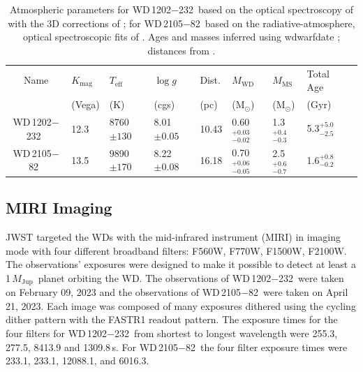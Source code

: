 \documentclass[twocolumn]{aastex631}
\newcommand{\mj}{\,$M_\mathrm{Jup}$}
\newcommand{\wdA}{WD\,1202$-$232}
\newcommand{\wdB}{WD\,2105$-$82}
\newcommand{\teff}{${T}_{\mathrm{eff}}$}
\newcommand{\logg}{$\log{g}$}
\begin{document}
\begin{table}[]
    \centering
    \begin{tabular}{c|llllllll}
    \hline
    \hline
  Name & $K_{\mathrm{mag}}$ &  \teff\ & \logg\ & Dist. &   $M_{\mathrm{WD}}$ & $M_\mathrm{{MS}}$ & Total Age \\
 & (Vega) & (K) & (cgs)  & (pc)  & (M$_{\odot}$) & (M$_{\odot}$) & (Gyr) \\ [0.5ex]
    \hline
         \wdA\   & 12.3  & 8760$\pm130$  & 8.01$\pm0.05$ &  10.43   & 0.60$^{+0.03}_{-0.02}$ & 1.3$^{+0.4}_{-0.3}$ & 5.3$^{+5.0}_{-2.5}$ \\
         \wdB\ &  13.5  & 9890$\pm170$ & 8.22$\pm0.08$ & 16.18  & 0.70$^{+0.06}_{-0.05}$ & 2.5$^{+0.6}_{-0.7}$ & 1.6$^{+0.8}_{-0.2}$ \\
    \end{tabular}
    \caption{Atmospheric parameters for \wdA\ based on the optical spectroscopy of \citet{Gianninas2011ApJ} with the 3D corrections of \citet{Tremblay2013}; for \wdB\ based on the radiative-atmosphere, optical spectroscopic fits of \citet{Gentile2018}. Ages and masses inferred using wdwarfdate \citep{Kiman2022}; distances from \citet{GaiaDR3}. }
    \label{tab:wdproperites}
\end{table}

\subsection{MIRI Imaging} \label{sec:}
JWST targeted the WDs with the mid-infrared instrument (MIRI) in imaging mode with four different broadband filters: F560W, F770W, F1500W, F2100W.  The observations' exposures were designed to make it possible to detect at least a 1\mj\ planet orbiting the WD.  The observations of \wdA\ were taken on February 09, 2023 and the observations of \wdB\ were taken on April 21, 2023. Each image was composed of many exposures dithered using the cycling dither pattern with the FASTR1 readout pattern. The exposure times for the four filters for \wdA\ from shortest to longest wavelength were 255.3, 277.5, 8413.9 and 1309.8\,s. For \wdB\ the four filter exposure times were 233.1, 233.1, 12088.1, and 6016.3. 
\end{document}
